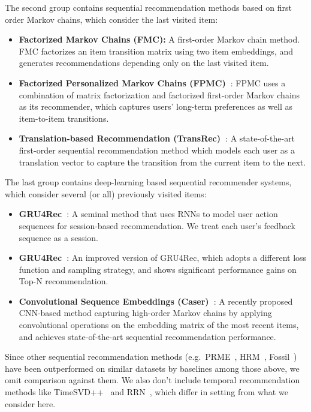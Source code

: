 \documentclass[conference]{IEEEtran}
\begin{document}
The second group contains sequential recommendation methods based on first order Markov chains, which consider the last visited item:
\begin{itemize}


\item\textbf{Factorized Markov Chains (FMC):} A first-order Markov chain method. FMC factorizes an item transition matrix using two item embeddings, and generates recommendations depending only on the last visited item.

\item\textbf{Factorized Personalized Markov Chains (FPMC)~\cite{rendle2010fpmc}}: FPMC uses a  combination of matrix factorization and factorized first-order Markov chains as its recommender, which captures users' long-term preferences as well as item-to-item transitions.

\item\textbf{Translation-based Recommendation (TransRec)~\cite{DBLP:conf/recsys/HeKM17}}: A state-of-the-art first-order sequential recommendation method which models each user as a translation vector to capture the transition from the current item to the next.
\end{itemize}

The last group contains deep-learning based sequential 
recommender systems,
which consider several (or all) previously visited items:

\begin{itemize}
\item\textbf{GRU4Rec~\cite{DBLP:journals/corr/HidasiKBT15}}: A seminal method 
that uses
RNNs to model user action sequences for session-based recommendation. We treat each user's feedback sequence as a session.

\item\textbf{GRU4Rec~\cite{DBLP:journals/corr/HidasiK17}}: An improved version of GRU4Rec, which adopts a different loss function and sampling strategy, and shows significant performance gains on Top-N recommendation.

\item\textbf{Convolutional Sequence Embeddings (Caser)~\cite{DBLP:conf/wsdm/TangW18}}: A recently proposed CNN-based method capturing high-order Markov chains by applying 
convolutional operations on the embedding matrix of the  most recent items, and achieves state-of-the-art sequential recommendation performance.
\end{itemize}

Since other sequential recommendation methods (e.g.~PRME~\cite{feng2015prme}, HRM~\cite{hrm}, Fossil~\cite{DBLP:conf/icdm/HeM16}) have been outperformed on similar datasets by 
baselines among those above,
we omit 
comparison against them. We also don't include temporal recommendation methods like TimeSVD++~\cite{timeSVD} and RRN~\cite{DBLP:conf/wsdm/WuABSJ17}, 
which differ in setting from what we consider here.
\end{document}
